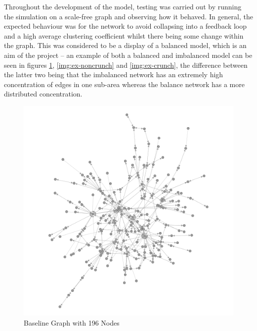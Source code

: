 \documentclass[]{report}
\begin{document}
Throughout the development of the model, testing was carried out by running the simulation on a scale-free graph and observing how it behaved. In general, the expected behaviour was for the network to avoid collapsing into a feedback loop and a high average clustering coefficient whilst there being some change within the graph. This was considered to be a display of a balanced model, which is an aim of the project – an example of both a balanced and imbalanced model can be seen in figures \ref{img:ex-simbase}, \ref{img:ex-noncrunch} and \ref{img:ex-crunch}, the difference between the latter two being that the imbalanced network has an extremely high concentration of edges in one sub-area whereas the balance network has a more distributed concentration.

\begin{figure}
\label{img:ex-simbase}
\begin{center}
\includegraphics[scale=0.25]{simbase.png}
\end{center}
\caption{Baseline Graph with 196 Nodes}
\end{figure}
\end{document}
